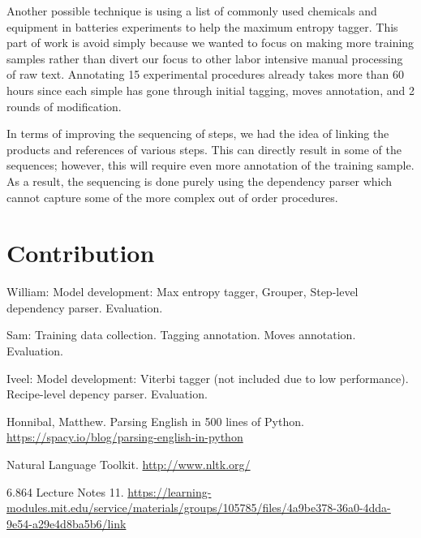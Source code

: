 Another possible technique is using a list of commonly used chemicals and equipment in batteries experiments to help the maximum entropy tagger. This part of work is avoid simply because we wanted to focus on making more training samples rather than divert our focus to other labor intensive manual processing of raw text. Annotating 15 experimental procedures already takes more than 60 hours since each simple has gone through initial tagging, moves annotation, and 2 rounds of modification. 

In terms of improving the sequencing of steps, we had the idea of linking the products and references of various steps. This can directly result in some of the sequences; however, this will require even more annotation of the training sample. As a result, the sequencing is done purely using the dependency parser which cannot capture some of the more complex out of order procedures. 

\section{Contribution}

William: Model development: Max entropy tagger, Grouper, Step-level dependency parser. Evaluation.

Sam: Training data collection. Tagging annotation. Moves annotation. Evaluation.

Iveel: Model development: Viterbi tagger (not included due to low performance). Recipe-level depency parser. Evaluation.

\begin{thebibliography}{8}
Honnibal, Matthew. Parsing English in 500 lines of Python.
\href{https://spacy.io/blog/parsing-english-in-python}{https://spacy.io/blog/parsing-english-in-python}

Natural Language Toolkit.
\href{http://www.nltk.org/}{http://www.nltk.org/}

6.864 Lecture Notes 11. 
\href{https://learning-modules.mit.edu/service/materials/groups/105785/files/4a9be378-36a0-4dda-9e54-a29e4d8ba5b6/link}{https://learning-modules.mit.edu/service/materials/groups/105785/files/4a9be378-36a0-4dda-9e54-a29e4d8ba5b6/link}

\end{thebibliography}


